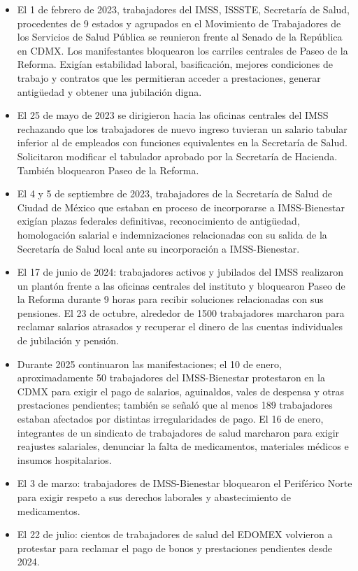 \documentclass[12pt,letterpaper]{article}
\begin{document}
\begin{itemize}
  \item El 1 de febrero de 2023, trabajadores del IMSS, ISSSTE, Secretaría de Salud, procedentes de 9 estados y agrupados en el Movimiento de Trabajadores de los Servicios de Salud Pública se reunieron frente al Senado de la República en CDMX. Los manifestantes bloquearon los carriles centrales de Paseo de la Reforma. Exigían estabilidad laboral, basificación, mejores condiciones de trabajo y contratos que les permitieran acceder a prestaciones, generar antigüedad y obtener una jubilación digna.

  \item El 25 de mayo de 2023 se dirigieron hacia las oficinas centrales del IMSS rechazando que los trabajadores de nuevo ingreso tuvieran un salario tabular inferior al de empleados con funciones equivalentes en la Secretaría de Salud. Solicitaron modificar el tabulador aprobado por la Secretaría de Hacienda. También bloquearon Paseo de la Reforma.

  \item El 4 y 5 de septiembre de 2023, trabajadores de la Secretaría de Salud de Ciudad de México que estaban en proceso de incorporarse a IMSS-Bienestar exigían plazas federales definitivas, reconocimiento de antigüedad, homologación salarial e indemnizaciones relacionadas con su salida de la Secretaría de Salud local ante su incorporación a IMSS-Bienestar.

  \item El 17 de junio de 2024: trabajadores activos y jubilados del IMSS realizaron un plantón frente a las oficinas centrales del instituto y bloquearon Paseo de la Reforma durante 9 horas para recibir soluciones relacionadas con sus pensiones. El 23 de octubre, alrededor de 1500 trabajadores marcharon para reclamar salarios atrasados y recuperar el dinero de las cuentas individuales de jubilación y pensión.

  \item Durante 2025 continuaron las manifestaciones; el 10 de enero, aproximadamente 50 trabajadores del IMSS-Bienestar protestaron en la CDMX para exigir el pago de salarios, aguinaldos, vales de despensa y otras prestaciones pendientes; también se señaló que al menos 189 trabajadores estaban afectados por distintas irregularidades de pago. El 16 de enero, integrantes de un sindicato de trabajadores de salud marcharon para exigir reajustes salariales, denunciar la falta de medicamentos, materiales médicos e insumos hospitalarios.

  \item El 3 de marzo: trabajadores de IMSS-Bienestar bloquearon el Periférico Norte para exigir respeto a sus derechos laborales y abastecimiento de medicamentos.

  \item El 22 de julio: cientos de trabajadores de salud del EDOMEX volvieron a protestar para reclamar el pago de bonos y prestaciones pendientes desde 2024.
\end{itemize}
\end{document}
